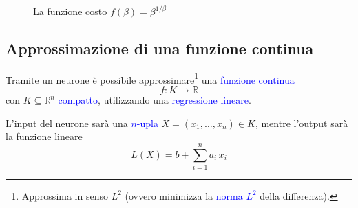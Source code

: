 \documentclass[10pt]{book}
\newcommand{\1}{\mathds{1}}
\newcommand{\R}{\mathds{R}}
\theoremstyle{definition}%
\theoremstyle{plain}
\theoremstyle{remark}
\renewcommand{\href}[2]{\textcolor{blue}{#2}}
\begin{document}
\begin{figure}
\begin{center}
\end{center}
\caption{\label{fig:funzionecostobeta}La funzione costo \(f(\beta)=\beta^{1/\beta}\)}
\end{figure}
\subsection{Approssimazione di una funzione continua}
\label{sec:orge3cd164}

Tramite un neurone è possibile approssimare\footnote{Approssima in senso \(L^{2}\) (ovvero minimizza la \href{../../../../../org/roam/20250624162220-spazi_lp.org}{norma \(L^{2}\)} della differenza).} una \href{../../../../../org/roam/20250103103252-funzione_continua.org}{funzione continua}
\begin{equation*}
f: K\to \R
\end{equation*}
con \(K \subseteq \R^{n}\) \href{../../../../../org/roam/20250103163701-spazio_topologico_compatto.org}{compatto}, utilizzando una \href{../../../../../org/roam/20250710111143-regressione_lineare.org}{regressione lineare}.

L'input del neurone sarà una \href{../../../../../org/roam/20250206170922-sequenze_e_stringhe.org}{\(n\)-upla} \(X=(x_{1},\dots,x_{n}) \in K\), mentre l'output sarà la funzione lineare
\begin{equation*}
L(X) = b+\sum_{i=1}^{n} a_{i}\,x_{i}
\end{equation*}
\end{document}
